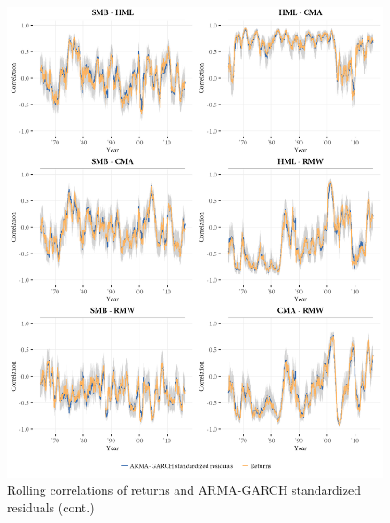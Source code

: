\begin{figure}[!ht]
  \ContinuedFloat
  \centering
  \footnotesize
  \includegraphics[scale=1]{graphics/appendix_rolling2.png}

  \caption{Rolling correlations of returns and ARMA-GARCH standardized residuals (cont.)}
\end{figure}



